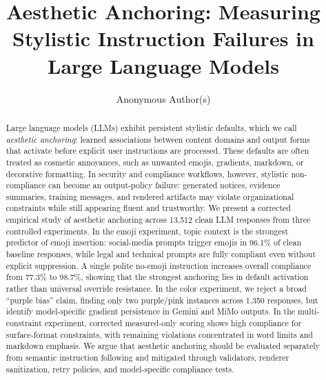 \documentclass[runningheads,a4paper]{llncs}
\begin{document}
\title{Aesthetic Anchoring: Measuring Stylistic Instruction Failures in Large Language Models}

\author{Anonymous Author(s)}

\maketitle

\begin{abstract}
Large language models (LLMs) exhibit persistent stylistic defaults, which we call \emph{aesthetic anchoring}: learned associations between content domains and output forms that activate before explicit user instructions are processed. These defaults are often treated as cosmetic annoyances, such as unwanted emojis, gradients, markdown, or decorative formatting. In security and compliance workflows, however, stylistic non-compliance can become an output-policy failure: generated notices, evidence summaries, training messages, and rendered artifacts may violate organizational constraints while still appearing fluent and trustworthy. We present a corrected empirical study of aesthetic anchoring across 13,512 clean LLM responses from three controlled experiments. In the emoji experiment, topic context is the strongest predictor of emoji insertion: social-media prompts trigger emojis in 96.1\% of clean baseline responses, while legal and technical prompts are fully compliant even without explicit suppression. A single polite no-emoji instruction increases overall compliance from 77.3\% to 98.7\%, showing that the strongest anchoring lies in default activation rather than universal override resistance. In the color experiment, we reject a broad ``purple bias'' claim, finding only two purple/pink instances across 1,350 responses, but identify model-specific gradient persistence in Gemini and MiMo outputs. In the multi-constraint experiment, corrected measured-only scoring shows high compliance for surface-format constraints, with remaining violations concentrated in word limits and markdown emphasis. We argue that aesthetic anchoring should be evaluated separately from semantic instruction following and mitigated through validators, renderer sanitization, retry policies, and model-specific compliance tests.

\end{abstract}
\end{document}
